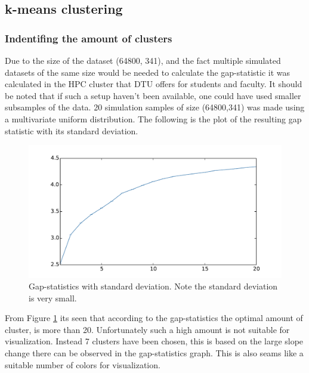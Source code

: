 \subsection{k-means clustering}

\subsubsection{Indentifing the amount of clusters}
Due to the size of the dataset (64800, 341), and the fact multiple simulated datasets of the same size would be needed to calculate the gap-statistic it was calculated in the HPC cluster that DTU offers for students and faculty.
It should be noted that if such a setup haven't been available, one could have used smaller subsamples of the data.
20 simulation samples of size (64800,341) was made using a multivariate uniform distribution. The following is the plot of the resulting gap statistic with its standard deviation.
\begin{figure}[H]
	\center
	\includegraphics[width=\textwidth]{figures/kmeans-gap}
	\caption{Gap-statistics with standard deviation. Note the standard deviation is very small.}
	\label{fig:kmeans-gap}
\end{figure}

From Figure \ref{fig:kmeans-gap} its seen that according to the gap-statistics the optimal amount of cluster, is more than 20. Unfortunately such a high amount is not suitable for visualization. Instead 7 clusters have been chosen, this is based on the large slope change there can be observed in the gap-statistics graph. This is also seams like a suitable number of colors for visualization.


